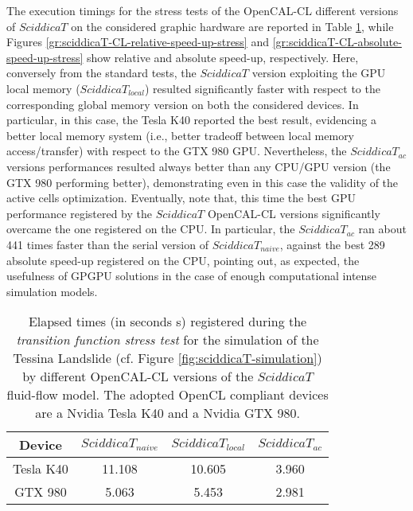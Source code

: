 The execution timings for the stress tests of the OpenCAL-CL
different versions of $SciddicaT$ on the considered graphic
hardware are reported in Table
\ref{tab:sciddicaT-CL-execution-times}, while Figures
\ref{gr:sciddicaT-CL-relative-speed-up-stress} and
\ref{gr:sciddicaT-CL-absolute-speed-up-stress} show relative and
absolute speed-up, respectively. Here, conversely from the
standard tests, the $SciddicaT$ version exploiting the GPU local
memory ($SciddicaT_{local}$) resulted significantly faster with
respect to the corresponding global memory version on both the
considered devices. In particular, in this case, the Tesla K40
reported the best result, evidencing a better local memory system
(i.e., better tradeoff between local memory access/transfer) with
respect to the GTX 980 GPU. Nevertheless, the $SciddicaT_{ac}$
versions performances resulted always better than any CPU/GPU
version (the GTX 980 performing better), demonstrating even in
this case the validity of the active cells
optimization. Eventually, note that, this time the best GPU
performance registered by the $SciddicaT$ OpenCAL-CL versions
significantly overcame the one registered on the CPU. In
particular, the $SciddicaT_{ac}$ ran about 441 times faster than
the serial version of $SciddicaT_{naive}$, against the best 289
absolute speed-up registered on the CPU, pointing out, as
expected, the usefulness of GPGPU solutions in the case of enough
computational intense simulation models.
\begin{table}
	\centering
	\begin{tabular}{cccc}
		\hline Device & $SciddicaT_{naive}$ & $SciddicaT_{local}$ &
		$SciddicaT_{ac}$ \\ \hline Tesla K40 & 11.108 & 10.605 &
		3.960\\ GTX 980 & 5.063 & 5.453 & 2.981\\ \hline
	\end{tabular}
	\caption[Elapsed times (in seconds \si{s}) registered during the \emph{transition
		function stress test} by different OpenCAL-CL
	versions of the $SciddicaT$ fluid-flow model.]{Elapsed times (in seconds \si{s}) registered during the \emph{transition
			function stress test} for the simulation of the Tessina Landslide
		(cf. Figure \ref{fig:sciddicaT-simulation}) by different OpenCAL-CL
		versions of the $SciddicaT$ fluid-flow model. The adopted OpenCL
		compliant devices are a Nvidia Tesla K40 and a Nvidia GTX 980.}
	\label{tab:sciddicaT-CL-execution-times}
\end{table}
